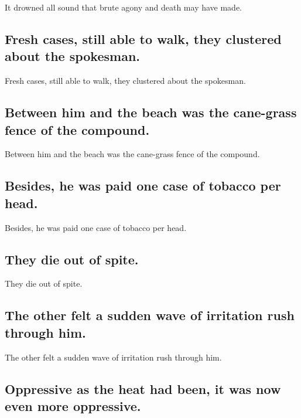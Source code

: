 \documentclass[]{article}
\begin{document}
It drowned all sound that brute agony and death may have made.

\hypertarget{fresh-cases-still-able-to-walk-they-clustered-about-the-spokesman.}{%
\subsection{Fresh cases, still able to walk, they clustered about the
spokesman.}\label{fresh-cases-still-able-to-walk-they-clustered-about-the-spokesman.}}

Fresh cases, still able to walk, they clustered about the spokesman.

\hypertarget{between-him-and-the-beach-was-the-cane-grass-fence-of-the-compound.}{%
\subsection{Between him and the beach was the cane-grass fence of the
compound.}\label{between-him-and-the-beach-was-the-cane-grass-fence-of-the-compound.}}

Between him and the beach was the cane-grass fence of the compound.

\hypertarget{besides-he-was-paid-one-case-of-tobacco-per-head.}{%
\subsection{Besides, he was paid one case of tobacco per
head.}\label{besides-he-was-paid-one-case-of-tobacco-per-head.}}

Besides, he was paid one case of tobacco per head.

\hypertarget{they-die-out-of-spite.}{%
\subsection{They die out of spite.}\label{they-die-out-of-spite.}}

They die out of spite.

\hypertarget{the-other-felt-a-sudden-wave-of-irritation-rush-through-him.}{%
\subsection{The other felt a sudden wave of irritation rush through
him.}\label{the-other-felt-a-sudden-wave-of-irritation-rush-through-him.}}

The other felt a sudden wave of irritation rush through him.

\hypertarget{oppressive-as-the-heat-had-been-it-was-now-even-more-oppressive.}{%
\subsection{Oppressive as the heat had been, it was now even more
oppressive.}\label{oppressive-as-the-heat-had-been-it-was-now-even-more-oppressive.}}
\end{document}
